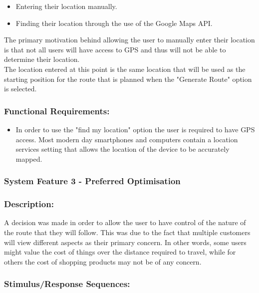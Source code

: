 \documentclass[10pt,twocolumn]{witseiepaper}
\begin{document}
		\begin{itemize}
			\item Entering their location manually.
			\item Finding their location through the use of the Google Maps API.
		\end{itemize}
		
		The primary motivation behind allowing the user to manually enter their location is that not all users will have access to GPS and thus will not be able to determine their location. \\
		
		The location entered at this point is the same location that will be used as the starting position for the route that is planned when the "Generate Route" option is selected.
		
		\subsubsection*{Functional Requirements:}
		
		\begin{itemize}
			\item In order to use the "find my location" option the user is required to have GPS access. Most modern day smartphones and computers contain a location services setting that allows the location of the device to be accurately mapped. 
		\end{itemize}
		
		\subsubsection{System Feature 3 - Preferred Optimisation}
		
		\subsubsection*{Description:}
		
		A decision was made in order to allow the user to have control of the nature of the route that they will follow. This was due to the fact that multiple customers will view different aspects as their primary concern. In other words, some users might value the cost of things over the distance required to travel, while for others the cost of shopping products may not be of any concern. 
		
		\subsubsection*{Stimulus/Response Sequences:}
		
\end{document}
